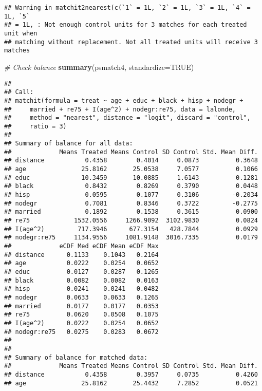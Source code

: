 \documentclass[]{article}
\newenvironment{Shaded}{\begin{snugshade}}{\end{snugshade}}
\newcommand{\CommentTok}[1]{\textcolor[rgb]{0.56,0.35,0.01}{\textit{#1}}}
\newcommand{\DataTypeTok}[1]{\textcolor[rgb]{0.13,0.29,0.53}{#1}}
\newcommand{\KeywordTok}[1]{\textcolor[rgb]{0.13,0.29,0.53}{\textbf{#1}}}
\newcommand{\NormalTok}[1]{#1}
\newcommand{\OtherTok}[1]{\textcolor[rgb]{0.56,0.35,0.01}{#1}}
\begin{document}
\begin{verbatim}
## Warning in matchit2nearest(c(`1` = 1L, `2` = 1L, `3` = 1L, `4` = 1L, `5`
## = 1L, : Not enough control units for 3 matches for each treated unit when
## matching without replacement. Not all treated units will receive 3 matches
\end{verbatim}

\begin{Shaded}
\begin{Highlighting}[]
\CommentTok{# Check balance}
\KeywordTok{summary}\NormalTok{(psmatch4, }\DataTypeTok{standardize=}\OtherTok{TRUE}\NormalTok{)}
\end{Highlighting}
\end{Shaded}

\begin{verbatim}
## 
## Call:
## matchit(formula = treat ~ age + educ + black + hisp + nodegr + 
##     married + re75 + I(age^2) + nodegr:re75, data = lalonde, 
##     method = "nearest", distance = "logit", discard = "control", 
##     ratio = 3)
## 
## Summary of balance for all data:
##             Means Treated Means Control SD Control Std. Mean Diff.
## distance           0.4358        0.4014     0.0873          0.3648
## age               25.8162       25.0538     7.0577          0.1066
## educ              10.3459       10.0885     1.6143          0.1281
## black              0.8432        0.8269     0.3790          0.0448
## hisp               0.0595        0.1077     0.3106         -0.2034
## nodegr             0.7081        0.8346     0.3722         -0.2775
## married            0.1892        0.1538     0.3615          0.0900
## re75            1532.0556     1266.9092  3102.9830          0.0824
## I(age^2)         717.3946      677.3154   428.7844          0.0929
## nodegr:re75     1134.9556     1081.9148  3016.7335          0.0179
##             eCDF Med eCDF Mean eCDF Max
## distance      0.1133    0.1043   0.2164
## age           0.0222    0.0254   0.0652
## educ          0.0127    0.0287   0.1265
## black         0.0082    0.0082   0.0163
## hisp          0.0241    0.0241   0.0482
## nodegr        0.0633    0.0633   0.1265
## married       0.0177    0.0177   0.0353
## re75          0.0620    0.0508   0.1075
## I(age^2)      0.0222    0.0254   0.0652
## nodegr:re75   0.0275    0.0283   0.0672
## 
## 
## Summary of balance for matched data:
##             Means Treated Means Control SD Control Std. Mean Diff.
## distance           0.4358        0.3957     0.0735          0.4260
## age               25.8162       25.4432     7.2852          0.0521

\end{verbatim}
\end{document}
